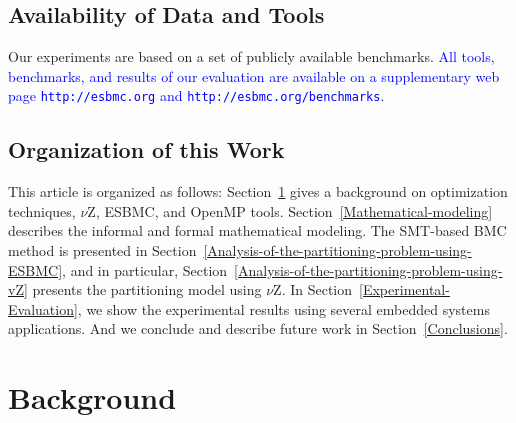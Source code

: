 \documentclass{doublecol-new}
\theoremstyle{TH}{
\newtheorem{lemma}{Lemma}
\newtheorem{theorem}[lemma]{Theorem}
\newtheorem{corrolary}[lemma]{Corrolary}
\newtheorem{conjecture}[lemma]{Conjecture}
\newtheorem{proposition}[lemma]{Proposition}
\newtheorem{claim}[lemma]{Claim}
\newtheorem{stheorem}[lemma]{Wrong Theorem}
\newtheorem{algorithm}{Algorithm}
}
\theoremstyle{THrm}{
\newtheorem{definition}{Definition}[section]
\newtheorem{question}{Question}[section]
\newtheorem{remark}{Remark}
\newtheorem{scheme}{Scheme}
}
\theoremstyle{THhit}{
\newtheorem{case}{Case}[section]
}
\begin{document}

\subsection{Availability of Data and Tools}

Our experiments are based on a set of publicly available benchmarks. \textcolor{blue}{All tools, benchmarks, and results of our evaluation are available on a supplementary web page \texttt{http://esbmc.org} and \texttt{http://esbmc.org/benchmarks}}.

\subsection{Organization of this Work}

This article is organized as follows: Section~\ref{background} gives a background on optimization techniques, $\nu$Z, ESBMC, and OpenMP tools. 
Section~\ref{Mathematical-modeling} describes the informal and formal mathematical modeling. The SMT-based BMC method is presented in Section~\ref{Analysis-of-the-partitioning-problem-using-ESBMC}, and in particular, Section~\ref{Analysis-of-the-partitioning-problem-using-vZ} presents the partitioning model using $\nu$Z. In Section~\ref{Experimental-Evaluation}, we show the experimental results using several embedded systems applications. And we conclude and describe future work in Section~\ref{Conclusions}.

\section{Background}
\label{background}
\end{document}
